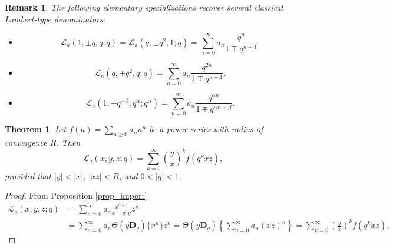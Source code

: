 \documentclass[12pt]{article}
\newcommand{\D}{\mathbf{D}}
\newcommand{\thp}{\Theta}
\newtheorem{theorem}{Theorem}
\newtheorem{remark}{Remark}
\begin{document}
\begin{remark}
The following elementary specializations recover several classical Lambert-type denominators:
\begin{itemize}
    \item 
    \begin{equation}
        \mathcal{L}_{a}(1,\pm q,q;q)=\mathcal{L}_{a}(q,\pm q^2,1;q)=\sum_{n=0}^{\infty}a_{n}\frac{q^n}{1\mp q^{n+1}}.
    \end{equation}
\item 
\begin{equation}
        \mathcal{L}_{a}(q,\pm q^2,q;q)=\sum_{n=0}^{\infty}a_{n}\frac{q^{2n}}{1\mp q^{n+1}}.
    \end{equation}
\item     
\begin{equation}
        \mathcal{L}_{a}(1,\pm q^{-\beta},q^\alpha;q^\alpha)=\sum_{n=0}^{\infty}a_{n}\frac{q^{\alpha n}}{1\mp q^{\alpha n+\beta}}.
    \end{equation}    
\end{itemize}
\end{remark}

\begin{theorem}\label{theo_gls}
Let \(f(u)=\sum_{n\ge0}a_nu^n\) be a power series with radius of convergence \(R\). Then
\begin{equation}
    \mathcal{L}_{a}(x,y,z;q)=\sum_{k=0}^{\infty}\left(\frac{y}{x}\right)^kf(q^kxz),
\end{equation}
provided that \(|y|<|x|\), \(|xz|<R\), and \(0<|q|<1\).
\end{theorem}
\begin{proof}
From Proposition \ref{prop_import}
    \begin{align*}
        \mathcal{L}_{a}(x,y,z;q)&=\sum_{n=0}^{\infty}a_{n}\frac{x^{n+1}}{x-q^ny}z^n\\
        &=\sum_{n=0}^{\infty}a_{n}\thp(y\D_{q})\{x^n\}z^n
        =\thp(y\D_{q})\left\{\sum_{n=0}^{\infty}a_{n}(xz)^n\right\}
        =\sum_{k=0}^{\infty}\left(\frac{y}{x}\right)^kf(q^kxz).
    \end{align*}
\end{proof}
\end{document}
